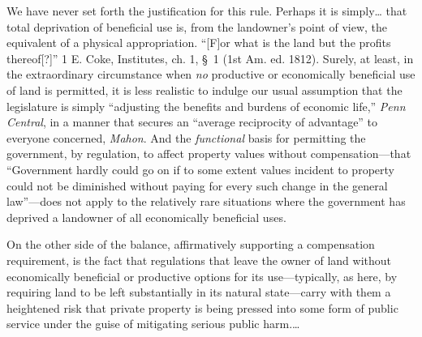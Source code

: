 We have never set forth the justification for this rule. Perhaps it is
simply\ldots
that total deprivation of beneficial use is, from
the landowner's point of view, the equivalent of a physical appropriation.
``[F]or what is the land but the profits thereof[?]'' 1 E.
Coke, Institutes, ch. 1, \S~1 (1st Am. ed. 1812). Surely, at least, in the
extraordinary circumstance when \textit{no} productive or economically
beneficial use of land is permitted, it is less realistic to indulge our usual
assumption that the legislature is simply ``adjusting the benefits and burdens
of economic life,'' \emph{Penn Central},
in a manner that secures an ``average reciprocity of advantage'' to everyone
concerned, \emph{Mahon}. And the
\textit{functional} basis for permitting the government, by regulation, to
affect property values without compensation---that ``Government hardly could go
on if to some extent values incident to property could not be diminished without
paying for every such change in the general law''---does
not apply to the relatively rare situations where the government has deprived a
landowner of all economically beneficial uses.

On the other side of the balance, affirmatively supporting a compensation
requirement, is the fact that regulations that leave the owner of land without
economically beneficial or productive options for its use---typically, as here,
by requiring land to be left substantially in its natural state---carry with
them a heightened risk that private property is being pressed into some form of
public service under the guise of mitigating serious public harm.\ldots


